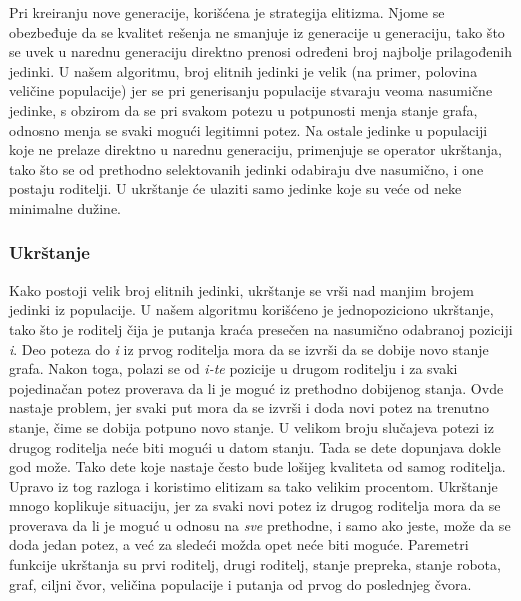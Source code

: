 \documentclass[12pt]{article}
\begin{document}
	Pri kreiranju nove generacije, korišćena je strategija elitizma. Njome se obezbeđuje da se kvalitet rešenja ne smanjuje iz generacije u generaciju, tako što se uvek u narednu generaciju direktno prenosi određeni broj najbolje prilagođenih jedinki. U našem algoritmu, broj elitnih jedinki je velik (na primer, polovina veličine populacije) jer se pri generisanju populacije stvaraju veoma nasumične jedinke, s obzirom da se pri svakom potezu u potpunosti menja stanje grafa, odnosno menja se svaki mogući legitimni potez. Na ostale jedinke u populaciji koje ne prelaze direktno u narednu generaciju, primenjuje se operator ukrštanja, tako što se od prethodno selektovanih jedinki odabiraju dve nasumično, i one postaju roditelji. U ukrštanje će ulaziti samo jedinke koje su veće od neke minimalne dužine.
	\vspace*{1\baselineskip}
	
	
	\subsubsection{Ukrštanje}
	\label{subsec:podnaslov2}
	
	Kako postoji velik broj elitnih jedinki, ukrštanje se vrši nad manjim brojem jedinki iz populacije. U našem algoritmu korišćeno je jednopoziciono ukrštanje, tako što je roditelj čija je putanja kraća presečen na nasumično odabranoj poziciji \textit{i}. Deo poteza do \textit{i} iz prvog roditelja mora da se izvrši da se dobije novo stanje grafa. Nakon toga, polazi se od \textit{i-te} pozicije u drugom roditelju i za svaki pojedinačan potez proverava da li je moguć iz prethodno dobijenog stanja. Ovde nastaje problem, jer svaki put mora da se izvrši i doda novi potez na trenutno stanje, čime se dobija potpuno novo stanje. U velikom broju slučajeva potezi iz drugog roditelja neće biti mogući u datom stanju. Tada se dete dopunjava dokle god može. Tako dete koje nastaje često bude lošijeg kvaliteta od samog roditelja. Upravo iz tog razloga i koristimo elitizam sa tako velikim procentom. Ukrštanje mnogo koplikuje situaciju, jer za svaki novi potez iz drugog roditelja mora da se proverava da li je moguć u odnosu na \textit{sve} prethodne, i samo ako jeste, može da se doda jedan potez, a već za sledeći možda opet neće biti moguće. Paremetri funkcije ukrštanja su
	prvi roditelj, drugi roditelj, stanje prepreka, stanje robota, graf, ciljni čvor, veličina populacije i putanja od prvog do poslednjeg čvora.
	\vspace*{1\baselineskip}
	
	
\end{document}
